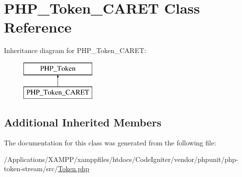 \hypertarget{class_p_h_p___token___c_a_r_e_t}{}\section{P\+H\+P\+\_\+\+Token\+\_\+\+C\+A\+R\+ET Class Reference}
\label{class_p_h_p___token___c_a_r_e_t}
Inheritance diagram for P\+H\+P\+\_\+\+Token\+\_\+\+C\+A\+R\+ET\+:\begin{figure}[H]
\begin{center}
\leavevmode
\includegraphics[height=2.000000cm]{class_p_h_p___token___c_a_r_e_t}
\end{center}
\end{figure}
\subsection*{Additional Inherited Members}


The documentation for this class was generated from the following file\+:\begin{DoxyCompactItemize}
\item 
/\+Applications/\+X\+A\+M\+P\+P/xamppfiles/htdocs/\+Code\+Igniter/vendor/phpunit/php-\/token-\/stream/src/\mbox{\hyperlink{_token_8php}{Token.\+php}}\end{DoxyCompactItemize}
